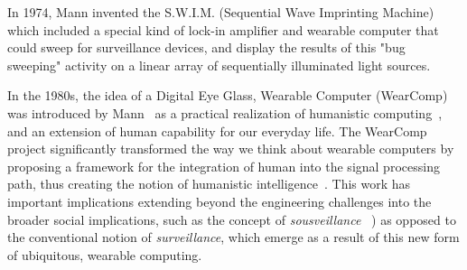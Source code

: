 In 1974, Mann invented the S.W.I.M. (Sequential Wave Imprinting Machine) which included a special kind of lock-in amplifier and wearable computer that could sweep for surveillance devices, and display the results of this "bug sweeping" activity on a linear array of sequentially illuminated light sources\cite{mann1992wavelets, impulse, mann2014sightfield, kineveillance}.

In the 1980s, the idea of a Digital Eye Glass, Wearable Computer (WearComp) was introduced by 
Mann~\cite{mannaaai361, mann1994mediated, mannwyckofftr, aimone2003eyetap} as a 
practical realization of humanistic computing~\cite{mann2001wearable, 
intelligentimageprocessing,presenceconnect,mann260}, and an extension of human capability for our 
everyday life. The WearComp project significantly transformed the way we think about wearable 
computers by proposing a framework for the integration of human into the signal processing path, 
thus creating the notion of humanistic intelligence~\cite{mann2001wearable, 
intelligentimageprocessing}. This work has important implications extending beyond the engineering 
challenges into the broader social implications, such as the concept of \emph{sousveillance}
~\cite{mann2002sousveillance, mann2004sousveillance, mann2006cyborglogging}) as opposed to 
the conventional notion of \emph{surveillance}, which emerge as a result of this new form of 
ubiquitous, wearable computing. 

